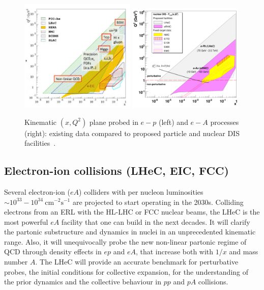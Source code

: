 \begin{figure}

 \centering
 \includegraphics[width=0.49\textwidth]{Strong-Interaction/img/britzger_dis2017.jpg}
 \includegraphics[width=0.49\textwidth]{Strong-Interaction/img/denterria_nDIS_x_Q2_map_future.pdf}

 \caption{Kinematic $(x, Q^2)$ plane probed in $e-p$ (left) and $e-A$ processes
(right): existing data compared to proposed particle and nuclear DIS
facilities~\cite{Britzger:2017,dEnterria:2007jwb}.}

 \label{fig:xQ2}

\end{figure}

\subsection{Electron-ion collisions (LHeC, EIC, FCC)}

Several electron-ion ($eA$) colliders with per nucleon luminosities $\sim
10^{33}-10^{34}~\mathrm{cm^{-2}s^{-1}}$ are projected to start operating in the
2030s.
Colliding
electrons from an ERL with the HL-LHC or FCC nuclear beams, the LHeC is the
most powerful $eA$ facility that one can build in the next decades. It will
clarify the partonic substructure and dynamics in nuclei in an unprecedented
kinematic range. Also, it will unequivocally probe the new non-linear partonic
regime of QCD through density effects in $ep$ and $eA$, that increase both with
$1/x$ and mass number $A$. The LHeC will provide an accurate benchmark for perturbative probes,
the initial conditions for collective expansion, for the understanding of the
prior dynamics and the collective behaviour  in $pp$ and $pA$ collisions.

